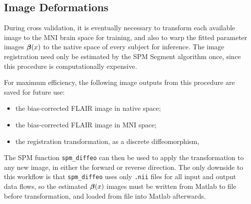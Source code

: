 \subsection{Image Deformations}\label{ss:spmdeform}
During cross validation,
it is eventually necessary to transform each available image to the MNI brain space for training,
and also to warp the fitted parameter images $\bm{\beta}(x)$
to the native space of every subject for inference.
The image registration need only be estimated by the SPM Segment algorithm once,
since this procedure is computationally expensive.
\par
For maximum efficiency, the following image outputs from this procedure are saved for future use:
\begin{itemize}[itemsep=0pt,topsep=0pt]
  \item the bias-corrected FLAIR image in native space;
  \item the bias-corrected FLAIR image in MNI space;
  \item the registration transformation, as a discrete diffeomorphism,
\end{itemize}
The SPM function \texttt{spm\_diffeo} can then be used
to apply the transformation to any new image, in either the forward or reverse direction.
The only downside to this workflow is that
\texttt{spm\_diffeo} uses only \texttt{.nii} files for all input and output data flows,
so the estimated $\bm{\beta}(x)$ images must be written from Matlab to file before transformation,
and loaded from file into Matlab afterwards.
